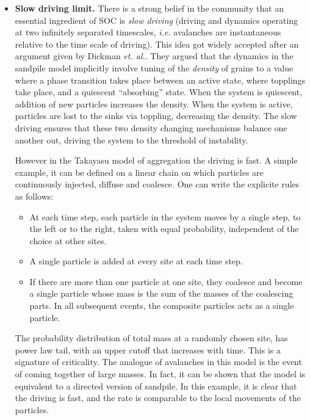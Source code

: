 \documentclass[11pt,a4paper]{book}
\begin{document}
\begin{itemize}
\item
\textbf{Slow driving limit.} There is a strong belief in the community that an essential ingredient of SOC is
\textit{slow driving} (driving and dynamics operating at two
infinitely separated timescales, \textit{i.e.} avalanches are
instantaneous relative to the time scale of driving). This idea got
widely accepted after an argument given by Dickman \textit{et.
al.}.\cite{path}
They argued that the dynamics in the sandpile model implicitly involve
tuning of the \textit{density} of grains to a value where a phase
transition takes place between an active state, where topplings take
place, and a
quiescent ``absorbing'' state. When the system is
quiescent, addition of new particles increases the density. When the
system is active, particles are lost to the sinks via toppling,
decreasing the density. The slow driving ensures that these two
density changing mechanisms balance one another out, driving the
system to the threshold of instability.

However in the Takayasu model of aggregation \cite{takayasu} the driving is fast. A
simple example, it can be defined on a linear chain on which particles
are continuously injected, diffuse and coalesce. One can write the
explicite rules as follows:
\begin{itemize}
\item
At each time step, each particle in the system moves by a single step,
to the left or to the right, taken with equal probability, independent
of the choice at other sites. 
\item
A single particle is added at every site at each time step.
\item
If there are more than one particle at one site, they coalesce and
become a single particle whose mass is the sum of the masses of the
coalescing parts. In all subsequent events, the composite particles
acts as a single particle.
\end{itemize}
The probability distribution of total mass at a
randomly chosen site, has power law tail, with an upper cutoff that
increases with time. This is a signature of criticality.
The analogue of avalanches in this model is the event of coming
together of large masses. In fact, it can be shown \cite{dharphysica06} that the model is
equivalent to a directed version of sandpile. In this example, it is
clear that the driving is fast, and the rate is comparable to the
local movements of the particles.


\end{itemize}
\end{document}
